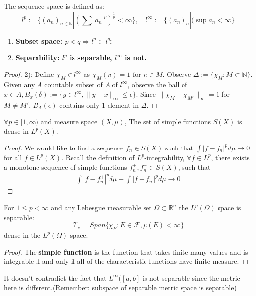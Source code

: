 \begin{example}
The sequence space is defined as:
\begin{equation*}
	l^p := \{(a_n)_{n \in \mathbb{N}} | (\sum |a_n|^p)^{\frac{1}{p}} < \infty \}, \quad l^\infty := \{(a_n)_n | (\sup a_n < \infty\}
\end{equation*}

\begin{enumerate}
	\item \textbf{Subset space: $p<q \Rightarrow l^p \subset l^q$:}
	\item \textbf{Separability: $l^p$ is separable, $l^\infty$ is not.}
\end{enumerate}
\begin{proof}
	2): Define $\chi_M \in l^\infty$ as $\chi_M(n) = 1$ for $n \in M$. Observe $\Delta:= \{\chi_M: M \subset \mathbb{N}\}$. Given any $A$ countable subset of $A$ of $l^\infty$, observe the ball of $x \in A, B_x(\delta):= \{ y \in l^\infty, \|y - x\|_\infty \le \epsilon\}$. Since $\|\chi_M - \chi_{M'}\|_\infty = 1$ for $M \neq M'$, $B_A(\epsilon)$ contains only 1 element in $\Delta$.  
\end{proof}
\end{example}

\begin{lemma}
	$\forall p \in [1, \infty)$ and measure space $(X, \mu)$, The set of simple functions $S(X)$ is dense in $L^p(X)$.
\end{lemma}
\begin{proof}
	We would like to find a sequence $f_n \in S(X)$ such that $\int |f - f_n|^p d\mu \rightarrow 0$ for all $f \in L^p(X)$. Recall the definition of $L^p$-integrability, $\forall f \in L^p$, there exists a monotone sequence of simple functions $f_n^+, f_n^- \in S(X)$, such that 
	\begin{align*}
		\int |f - f^+_n|^p d\mu -\int |f - f^-_n|^p d\mu  \rightarrow 0
	\end{align*}
\end{proof}

\begin{theorem}
	For $1 \leq p < \infty$ and any Lebesgue measurable set $\Omega \subset \mathbb{R}^n$  the $L^p(\Omega)$ space is separable:
	\begin{equation*}
		\mathcal{T}_e = Span\{ \chi_E: E \in \mathcal{F}, \mu(E) < \infty\}
	\end{equation*}
	dense in the $L^p(\Omega)$ space. 
\end{theorem}
\begin{proof}
	The \textbf{simple function} is the function that takes finite many values and is integrable if and only if all of the characteristic functions have finite measure.
\end{proof}
\begin{remark}
It doesn't contradict the fact that $L^\infty([a, b]$ is not separable since the metric here is different.(Remember: subspace of separable metric space is separable) 	
\end{remark}

